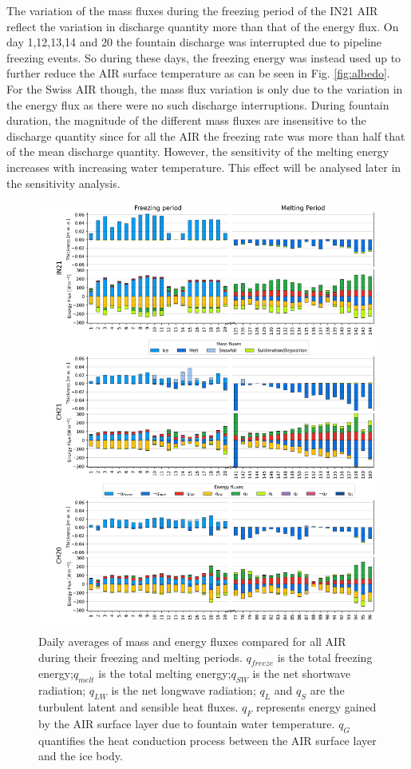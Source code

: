 \documentclass[utf8]{frontiersSCNS} %
\begin{document}
The variation of the mass fluxes during the freezing period of the IN21 AIR reflect the variation in discharge quantity
more than that of the energy flux. On day 1,12,13,14 and 20 the fountain discharge was interrupted due to pipeline
freezing events. So during these days, the freezing energy was instead used up to further reduce the AIR surface
temperature as can be seen in Fig. \ref{fig:albedo}. For the Swiss AIR though, the mass flux variation is only due to
the variation in the energy flux as there were no such discharge interruptions. During fountain duration, the magnitude
of the different mass fluxes are insensitive to the discharge quantity since for all the AIR the freezing rate was more
than half that of the mean discharge quantity. However, the sensitivity of the melting energy increases with increasing
water temperature. This effect will be analysed later in the sensitivity analysis.

\begin{figure}
\begin{center} 
\includegraphics[width=\linewidth]{Figures/mass_energy_bal.jpg} \end{center}
	\caption{Daily averages of mass and energy fluxes compared for all AIR during their freezing and melting periods.
		$q_{freeze}$ is the total freezing energy;$q_{melt}$ is the total melting energy;$q_{SW}$ is the net shortwave
		radiation; $q_{LW}$ is the net longwave radiation; $q_{L}$ and $q_{S}$ are the turbulent latent and sensible heat
		fluxes. $q_{F}$ represents energy gained by the AIR surface layer due to fountain water temperature.  $q_{G}$
		quantifies the heat conduction process between the AIR surface layer and the ice body. } \label{fig:MEB}
\end{figure}
\end{document}
